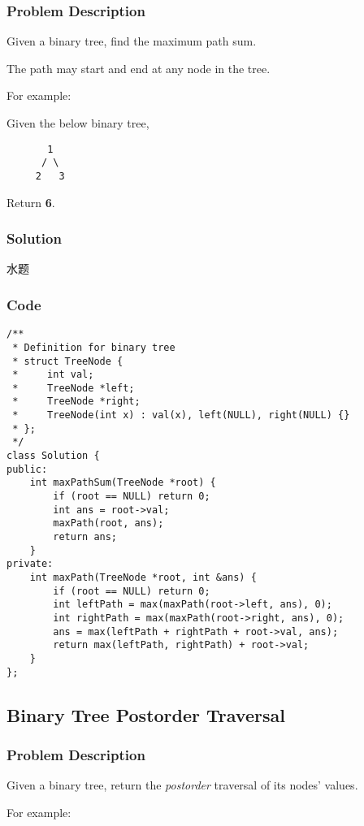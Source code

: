 \documentclass[courier]{article}
\begin{document}
\begin{CJK*}{UTF8}{gkai}
\subsubsection*{Problem Description}
Given a binary tree, find the maximum path sum.

The path may start and end at any node in the tree.

For example:


Given the below binary tree,
\begin{verbatim}
       1
      / \
     2   3
\end{verbatim}

Return \textbf{6}.



\subsubsection*{Solution}
水题

\subsubsection*{Code}
\begin{lstlisting}
/**
 * Definition for binary tree
 * struct TreeNode {
 *     int val;
 *     TreeNode *left;
 *     TreeNode *right;
 *     TreeNode(int x) : val(x), left(NULL), right(NULL) {}
 * };
 */
class Solution {
public:
    int maxPathSum(TreeNode *root) {
        if (root == NULL) return 0;
        int ans = root->val;
        maxPath(root, ans);
        return ans;
    }
private:
    int maxPath(TreeNode *root, int &ans) {
        if (root == NULL) return 0;
        int leftPath = max(maxPath(root->left, ans), 0);
        int rightPath = max(maxPath(root->right, ans), 0);
        ans = max(leftPath + rightPath + root->val, ans);
        return max(leftPath, rightPath) + root->val;
    }
}; 
\end{lstlisting}


\subsection{ Binary Tree Postorder Traversal }

\subsubsection*{Problem Description}
Given a binary tree, return the \emph{postorder} traversal of its nodes' values.

For example:



\end{CJK*}
\end{document}
